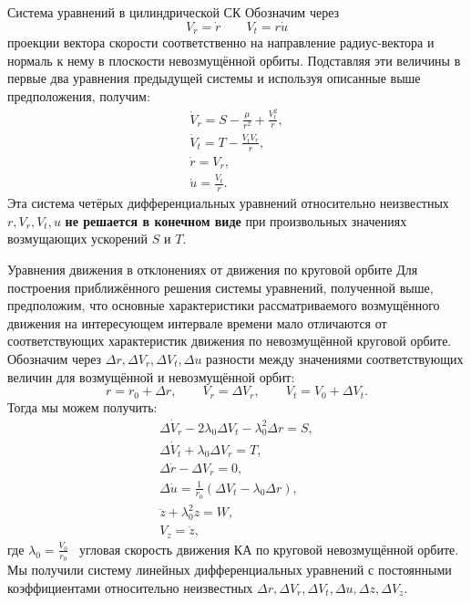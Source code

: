 \documentclass[9pt]{beamer}
\begin{document}
\begin{frame}{Система уравнений в цилиндрической СК}
Обозначим через
\begin{equation*}
    V_r = \dot{r} \quad \quad V_t = r \dot{u}
\end{equation*}
проекции вектора скорости соответственно на направление радиус-вектора и нормаль к нему в плоскости невозмущённой орбиты. Подставляя эти величины в первые два уравнения предыдущей системы и используя описанные выше предположения, получим:
\begin{gather*}
    \dot{V}_r = S - \frac{\mu}{r^2} + \frac{V_t^2}{r}, \\
    \dot{V}_t = T - \frac{V_t V_r}{r}, \\
    \dot{r} = V_r, \\
    \dot{u} = \frac{V_t}{r}.
\end{gather*}
Эта система четёрых дифференциальных уравнений относительно неизвестных $r, V_r, V_t, u$ \textbf{не решается в конечном виде} при произвольных значениях возмущающих ускорений $S$ и $T$.
\end{frame}

\begin{frame}{Уравнения движения в отклонениях от движения по круговой орбите}
Для построения приближённого решения системы уравнений, полученной выше, предположим, что основные характеристики рассматриваемого возмущённого движения на интересующем интервале времени мало отличаются от соответствующих характеристик движения по невозмущённой круговой орбите. Обозначим через $\Delta r, \Delta V_r, \Delta V_t, \Delta u$ разности между значениями соответствующих величин для возмущённой и невозмущённой орбит:
\begin{equation*}
    r = r_0 + \Delta r, \quad \quad V_r = \Delta V_r, \quad \quad V_t = V_0 + \Delta V_t.
\end{equation*}
Тогда мы можем получить:
\begin{gather*}
    \Delta \dot{V}_r - 2 \lambda_0 \Delta V_t - \lambda_0^2 \Delta r = S, \\
    \Delta \dot{V}_t + \lambda_0 \Delta V_r = T, \\
    \Delta \dot{r} - \Delta V_r = 0, \\
    \Delta \dot{u} = \frac{1}{r_0} \left( \Delta V_t - \lambda_0 \Delta r \right), \\
    \ddot{z} + \lambda_0^2 z = W, \\
    V_z = \dot{z},
\end{gather*}
где $\lambda_0 = \frac{V_0}{r_0}$ \textemdash\ угловая скорость движения КА по круговой невозмущённой орбите. \\
Мы получили систему линейных дифференциальных уравнений с постоянными коэффициентами относительно неизвестных $\Delta r, \Delta V_r, \Delta V_t, \Delta u, \Delta z, \Delta V_z$.
\end{frame}
\end{document}
